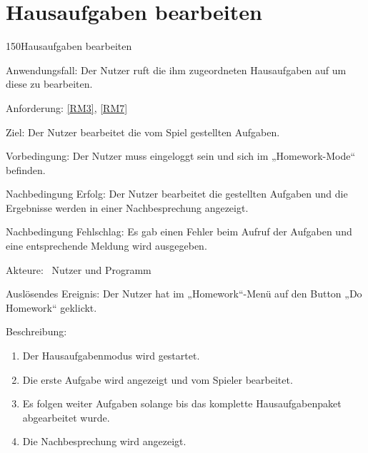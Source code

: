 \section{Hausaufgaben bearbeiten}
\begin{function}{150}{Hausaufgaben bearbeiten}
\item[Anwendungsfall:] Der Nutzer ruft die ihm zugeordneten Hausaufgaben auf um diese zu bearbeiten.
\item[Anforderung:] \ref{RM3}, \ref{RM7}
\item[Ziel:] Der Nutzer bearbeitet die vom Spiel gestellten Aufgaben.
\item[Vorbedingung:] Der Nutzer muss eingeloggt sein und sich im „Homework-Mode“ befinden.
\item[Nachbedingung Erfolg:]  Der Nutzer bearbeitet die gestellten Aufgaben und die Ergebnisse werden in einer Nachbesprechung angezeigt.
\item[Nachbedingung Fehlschlag:] Es gab einen Fehler beim Aufruf der Aufgaben und eine entsprechende Meldung wird ausgegeben.
\item[Akteure:] ~Nutzer und Programm
\item[Auslösendes Ereignis:] Der Nutzer hat im „Homework“-Menü auf den Button „Do Homework“ geklickt.
\item[Beschreibung:] ~
\begin{enumerate}
  \item  Der Hausaufgabenmodus wird gestartet.
  \item  Die erste Aufgabe wird angezeigt und vom Spieler bearbeitet.
  \item Es folgen weiter Aufgaben solange bis das komplette Hausaufgabenpaket abgearbeitet wurde.
  \item Die Nachbesprechung wird angezeigt.
\end{enumerate}
\end{function}

